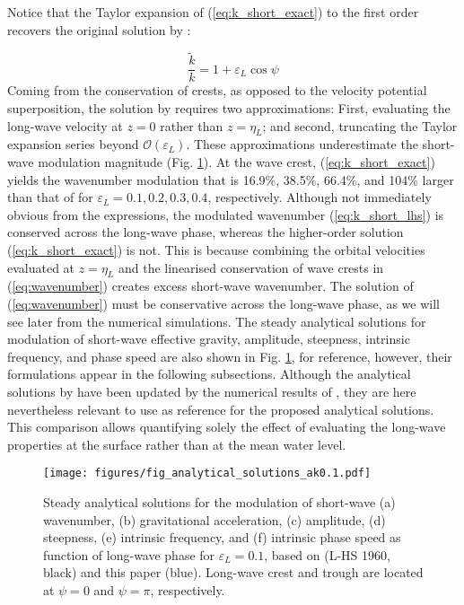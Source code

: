 \documentclass[lineno]{jfm}
\begin{document}
Notice that the Taylor expansion of (\ref{eq:k_short_exact}) to the first order
recovers the original solution by \citet{longuet1960changes}:

\begin{equation}
\label{eq:k_short_lhs}
\frac{\widetilde{k}}{k} = 1 + \varepsilon_L \cos{\psi}
\end{equation}
Coming from the conservation of crests, as opposed to the velocity potential
superposition, the solution by \citet{longuet1960changes} requires two
approximations:
First, evaluating the long-wave velocity at $z = 0$ rather than $z = \eta_L$; and
second, truncating the Taylor expansion series beyond $\mathcal{O}(\varepsilon_L)$.
These approximations underestimate the short-wave modulation magnitude
(Fig. \ref{fig:analytical_solutions_ak0.1}).
At the wave crest, (\ref{eq:k_short_exact}) yields the wavenumber modulation
that is 16.9\%, 38.5\%, 66.4\%, and 104\% larger than that of
\citet{longuet1960changes} for $\varepsilon_L = 0.1, 0.2, 0.3, 0.4$, respectively.
Although not immediately obvious from the expressions, the modulated wavenumber
(\ref{eq:k_short_lhs}) is conserved across the long-wave phase, whereas
the higher-order solution (\ref{eq:k_short_exact}) is not.
This is because combining the orbital velocities evaluated at $z=\eta_L$ and the
linearised conservation of wave crests in (\ref{eq:wavenumber}) creates excess
short-wave wavenumber.
The solution of (\ref{eq:wavenumber}) must be conservative across the long-wave
phase, as we will see later from the numerical simulations.
The steady analytical solutions for modulation of short-wave effective gravity,
amplitude, steepness, intrinsic frequency, and phase speed are also shown in
Fig. \ref{fig:analytical_solutions_ak0.1}, for reference, however, their
formulations appear in the following subsections.
Although the analytical solutions by \citet{longuet1960changes} have been updated
by the numerical results of \citet{longuet1987propagation}, they are here
nevertheless relevant to use as reference for the proposed analytical solutions.
This comparison allows quantifying solely the effect of evaluating the
long-wave properties at the surface rather than at the mean water level.

\begin{figure}
\centering
\texttt{[image: figures/fig\_analytical\_solutions\_ak0.1.pdf]}
\caption{
  Steady analytical solutions for the modulation of short-wave (a) wavenumber, (b)
  gravitational acceleration, (c) amplitude, (d) steepness, (e) intrinsic
  frequency, and (f) intrinsic phase speed as function of long-wave phase for
  $\varepsilon_L = 0.1$, based on
  \citet{longuet1960changes} (L-HS 1960, black) and this paper (blue).
  Long-wave crest and trough are located at $\psi = 0$ and $\psi = \pi$,
  respectively.
}
\label{fig:analytical_solutions_ak0.1}
\end{figure}
\end{document}
